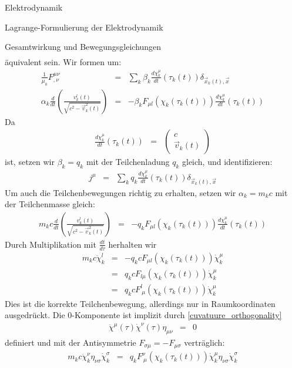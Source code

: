 \begin{chapter}{\titlestr}
\begin{section}{Elektrodynamik}
\begin{subsection}{Lagrange-Formulierung der Elektrodynamik}
\begin{subsubsection}{Gesamtwirkung und Bewegungsgleichungen}
\begin{eqnarray*}
\end{eqnarray*}
äquivalent sein. Wir formen um:
\begin{eqnarray*}
\frac{1}{\mu_0}F^{\mu\nu}_{,\nu} &=& \sum_k\beta_k \frac{d\chi_k^\mu}{dt}(\tau_k(t))\delta_{\vec{x}_k(t),\vec{x}}\\
\alpha_k \frac{d}{dt}\left(\frac{v^l_k(t)}{\sqrt{c^2-\vec{v}_k^2(t)}}\right)
&=& -\beta_k F_{\mu l}(\chi_k(\tau_k(t)))\frac{d\chi_k^\mu}{dt}(\tau_k(t)) 
\end{eqnarray*}
Da
\begin{eqnarray*}
\frac{d\chi_k^\mu}{dt}(\tau_k(t)) &=& \begin{pmatrix}
c\\
\vec{v}_k(t)
\end{pmatrix}
\end{eqnarray*}
ist, setzen wir $\beta_k=q_k$ mit der Teilchenladung $q_k$ gleich, und identifizieren:
\begin{eqnarray}
\label{particle_current}
j ^\mu &=& \sum_k q_k \frac{d\chi_k^\mu}{dt}(\tau_k(t))\delta_{\vec{x}_k(t),\vec{x}}
\end{eqnarray}
Um auch die Teilchenbewegungen richtig zu erhalten, setzen wir $\alpha_k=m_kc$ mit der Teilchenmasse gleich:
\begin{eqnarray*}
m_kc \frac{d}{dt}\left(\frac{v^l_k(t)}{\sqrt{c^2-\vec{v}_k^2(t)}}\right)
&=& -q_k F_{\mu l}(\chi_k(\tau_k(t)))\frac{d\chi_k^\mu}{dt}(\tau_k(t)) 
\end{eqnarray*}
Durch Multiplikation mit $\frac{dt}{d\tau}$ herhalten wir
\begin{eqnarray*}
m_kc \ddot{\chi}_k^l
&=& -q_kc F_{\mu l}(\chi_k(\tau_k(t)))\dot{\chi}_k^\mu\\
&=&q_kc F_{l\mu}(\chi_k(\tau_k(t)))\dot{\chi}_k^\mu\\
&=&q_kc F^l_{\ \mu}(\chi_k(\tau_k(t)))\dot{\chi}_k^\mu
\end{eqnarray*}
Dies ist die korrekte Teilchenbewegung, allerdings nur in Raumkoordinaten ausgedrückt.
Die $0$-Komponente ist implizit durch \ref{cuvatuure_orthogonality}
\begin{eqnarray*}
\ddot{\chi}^\mu(\tau)\dot{\chi}^\nu(\tau)\eta_{\mu\nu}  &=& 0
\end{eqnarray*}
definiert und mit der Antisymmetrie $F_{\sigma\mu}=-F_{\mu\sigma}$ verträglich:
\begin{eqnarray*}
m_kc \ddot{\chi}_k^\nu\eta_{\nu\sigma}\dot{\chi}_k^\sigma
&=&q_k F^\nu_{\ \mu}(\chi_k(\tau_k(t)))\dot{\chi}_k^\mu\eta_{\nu\sigma}\dot{\chi}_k^\sigma\\

\end{eqnarray*}
\end{subsubsection}
\end{subsection}
\end{section}
\end{chapter}
